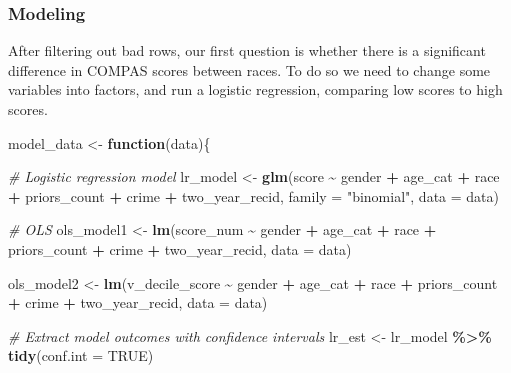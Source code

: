 \documentclass[
]{book}
\newenvironment{Shaded}{\begin{snugshade}}{\end{snugshade}}
\newcommand{\CommentTok}[1]{\textcolor[rgb]{0.56,0.35,0.01}{\textit{#1}}}
\newcommand{\ControlFlowTok}[1]{\textcolor[rgb]{0.13,0.29,0.53}{\textbf{#1}}}
\newcommand{\DataTypeTok}[1]{\textcolor[rgb]{0.13,0.29,0.53}{#1}}
\newcommand{\KeywordTok}[1]{\textcolor[rgb]{0.13,0.29,0.53}{\textbf{#1}}}
\newcommand{\NormalTok}[1]{#1}
\newcommand{\OperatorTok}[1]{\textcolor[rgb]{0.81,0.36,0.00}{\textbf{#1}}}
\newcommand{\OtherTok}[1]{\textcolor[rgb]{0.56,0.35,0.01}{#1}}
\newcommand{\StringTok}[1]{\textcolor[rgb]{0.31,0.60,0.02}{#1}}
\begin{document}
\hypertarget{modeling-1}{%
\subsubsection{Modeling}\label{modeling-1}}

After filtering out bad rows, our first question is whether there is a significant difference in COMPAS scores between races. To do so we need to change some variables into factors, and run a logistic regression, comparing low scores to high scores.

\begin{Shaded}
\begin{Highlighting}[]
\NormalTok{model\_data \textless{}{-}}\StringTok{ }\ControlFlowTok{function}\NormalTok{(data)\{}

\CommentTok{\# Logistic regression model}
\NormalTok{lr\_model \textless{}{-}}\StringTok{ }\KeywordTok{glm}\NormalTok{(score }\OperatorTok{\textasciitilde{}}\StringTok{ }\NormalTok{gender }\OperatorTok{+}\StringTok{ }\NormalTok{age\_cat }\OperatorTok{+}\StringTok{ }\NormalTok{race }\OperatorTok{+}\StringTok{ }\NormalTok{priors\_count }\OperatorTok{+}\StringTok{ }\NormalTok{crime }\OperatorTok{+}\StringTok{ }\NormalTok{two\_year\_recid, }
             \DataTypeTok{family =} \StringTok{"binomial"}\NormalTok{, }\DataTypeTok{data =}\NormalTok{ data)}

\CommentTok{\# OLS}
\NormalTok{ols\_model1 \textless{}{-}}\StringTok{ }\KeywordTok{lm}\NormalTok{(score\_num }\OperatorTok{\textasciitilde{}}\StringTok{ }\NormalTok{gender }\OperatorTok{+}\StringTok{ }\NormalTok{age\_cat }\OperatorTok{+}\StringTok{ }\NormalTok{race }\OperatorTok{+}\StringTok{ }\NormalTok{priors\_count }\OperatorTok{+}\StringTok{ }\NormalTok{crime }\OperatorTok{+}\StringTok{ }\NormalTok{two\_year\_recid, }
             \DataTypeTok{data =}\NormalTok{ data)}

\NormalTok{ols\_model2 \textless{}{-}}\StringTok{ }\KeywordTok{lm}\NormalTok{(v\_decile\_score }\OperatorTok{\textasciitilde{}}\StringTok{ }\NormalTok{gender }\OperatorTok{+}\StringTok{ }\NormalTok{age\_cat }\OperatorTok{+}\StringTok{ }\NormalTok{race }\OperatorTok{+}\StringTok{ }\NormalTok{priors\_count }\OperatorTok{+}\StringTok{ }\NormalTok{crime }\OperatorTok{+}\StringTok{ }\NormalTok{two\_year\_recid, }
             \DataTypeTok{data =}\NormalTok{ data)}

\CommentTok{\# Extract model outcomes with confidence intervals }
\NormalTok{lr\_est \textless{}{-}}\StringTok{ }\NormalTok{lr\_model }\OperatorTok{\%\textgreater{}\%}\StringTok{ }
\StringTok{    }\KeywordTok{tidy}\NormalTok{(}\DataTypeTok{conf.int =} \OtherTok{TRUE}\NormalTok{) }


\end{Highlighting}
\end{Shaded}
\end{document}
